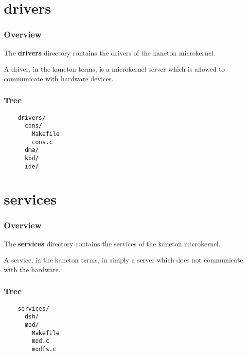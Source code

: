 \documentclass[8pt]{beamer}
\newcommand{\nl}[0]{\vspace{0.4cm}}
\begin{document}
%
%

\section{drivers}


\begin{frame}
  \frametitle{Overview}

  The \textbf{drivers} directory contains the drivers of the kaneton
  microkernel.

  \nl

  A driver, in the kaneton terms, is a microkernel server which is allowed
  to communicate with hardware devices.
\end{frame}


\begin{frame}[containsverbatim]
  \frametitle{Tree}

  \begin{verbatim}
    drivers/
      cons/
        Makefile
        cons.c
      dma/
      kbd/
      ide/
  \end{verbatim}
\end{frame}

%
%

\section{services}


\begin{frame}
  \frametitle{Overview}

  The \textbf{services} directory contains the services of the kaneton
  microkernel.

  \nl

  A service, in the kaneton terms, in simply a server which does not
  communicate with the hardware.
\end{frame}


\begin{frame}[containsverbatim]
  \frametitle{Tree}

  \begin{verbatim}
    services/
      dsh/
      mod/
        Makefile
        mod.c
        modfs.c
  \end{verbatim}
\end{frame}

%
%
\end{document}
